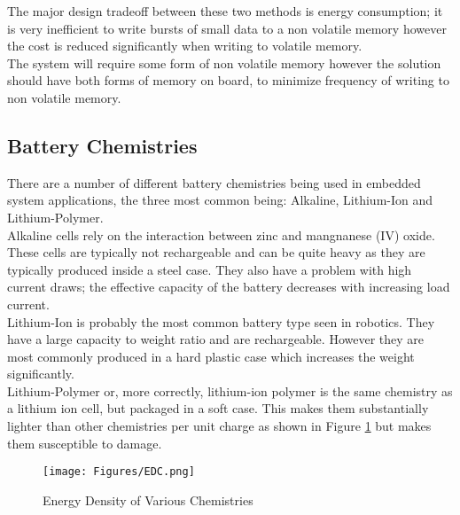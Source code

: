 \documentclass[12pt,openany,a4paper]{book}
\begin{document}
			The major design tradeoff between these two methods is energy consumption; it is very inefficient to write bursts of small data to a non volatile memory \cite{Sandisk} however the cost is reduced significantly when writing to volatile memory. \\
			
			The system will require some form of non volatile memory however the solution should have both forms of memory on board, to minimize frequency of writing to non volatile memory.
			
			
		\subsection{Battery Chemistries}
			There are a number of different battery chemistries being used in embedded system applications, the three most common being: Alkaline, Lithium-Ion and Lithium-Polymer. \\
			
			Alkaline cells rely on the interaction between zinc and mangnanese (IV) oxide. These cells are typically not rechargeable and can be quite heavy as they are typically produced inside a steel case. They also have a problem with high current draws; the effective capacity of the battery decreases with increasing load current. \\
			
			Lithium-Ion is probably the most common battery type seen in robotics. They have a large capacity to weight ratio and are rechargeable. However they are most commonly produced in a hard plastic case which increases the weight significantly. \\
			
			Lithium-Polymer or, more correctly, lithium-ion polymer is the same chemistry as a lithium ion cell, but packaged in a soft case. This makes them substantially lighter than other chemistries per unit charge as shown in Figure \ref{fig:BAT} but makes them susceptible to damage. \\
			
			\begin{figure}[H]
				\centering
				\texttt{[image: Figures/EDC.png]}
				\caption{Energy Density of Various Chemistries \cite{icc}}
				\label{fig:BAT}
			\end{figure}		
	
\end{document}
